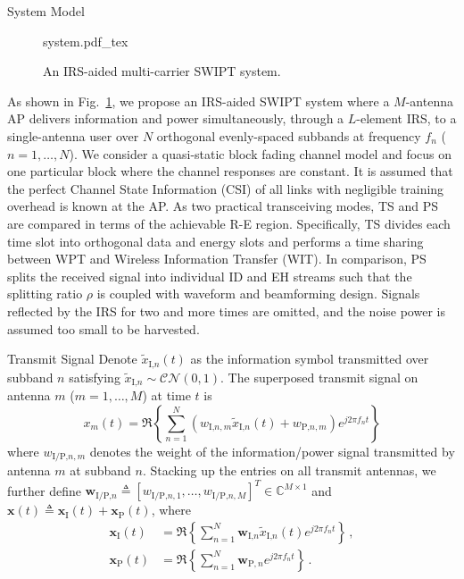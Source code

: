 \documentclass[journal]{IEEEtran}
\begin{document}
	\begin{section}{System Model}\label{se:system_model}
		\begin{figure}[!t]
			\centering
			\def\svgwidth{\columnwidth}
			{system.pdf_tex}
			\caption{An IRS-aided multi-carrier SWIPT system.}
			\label{fi:system}
		\end{figure}

		As shown in Fig.~\ref{fi:system}, we propose an IRS-aided SWIPT system where a $M$-antenna AP delivers information and power simultaneously, through a $L$-element IRS, to a single-antenna user over $N$ orthogonal evenly-spaced subbands at frequency $f_n$ ($n=1,\dots,N$). We consider a quasi-static block fading channel model and focus on one particular block where the channel responses are constant. It is assumed that the perfect Channel State Information (CSI) of all links with negligible training overhead is known at the AP. As two practical transceiving modes, TS and PS are compared in terms of the achievable R-E region. Specifically, TS divides each time slot into orthogonal data and energy slots and performs a time sharing between WPT and Wireless Information Transfer (WIT). In comparison, PS splits the received signal into individual ID and EH streams such that the splitting ratio $\rho$ is coupled with waveform and beamforming design. Signals reflected by the IRS for two and more times are omitted, and the noise power is assumed too small to be harvested.


		\begin{subsection}{Transmit Signal}
			Denote $\tilde{x}_{\text{I,}n}(t)$ as the information symbol transmitted over subband $n$ satisfying $\tilde{x}_{\text{I,}n}\sim\mathcal{CN}(0,1)$. The superposed transmit signal on antenna $m$ ($m=1,\dots,M$) at time $t$ is
			\begin{equation}\label{eq:x_m}
				x_m(t)=\Re\left\{\sum_{n=1}^N\left({w_{\text{I,}n,m}\tilde{x}_{\text{I,}n}(t)}+w_{\text{P,}n,m}\right){e^{j2{\pi}{f_n}{t}}}\right\}
			\end{equation}
			where $w_{\text{I/P,}n,m}$ denotes the weight of the information/power signal transmitted by antenna $m$ at subband $n$. Stacking up the entries on all transmit antennas, we further define $\boldsymbol{w}_{\text{I/P,}n} \triangleq [w_{\text{I/P,}n,1},\dots,w_{\text{I/P,}n,M}]^T \in \mathbb{C}^{M \times 1}$ and $\boldsymbol{x}(t) \triangleq \boldsymbol{x}_{\text{I}}(t)+\boldsymbol{x}_{\text{P}}(t)$, where
			\begin{align}
				\boldsymbol{x}_{\text{I}}(t) &= \Re{\left\{\sum_{n=1}^N\boldsymbol{w}_{\text{I,}n}\tilde{x}_{\text{I,}n}(t){e^{j2{\pi}{f_n}{t}}}\right\}}\,,\label{eq:x_I}\\
				\boldsymbol{x}_{\text{P}}(t) &= \Re{\left\{\sum_{n=1}^N\boldsymbol{w}_{\text{P},n}{e^{j2{\pi}{f_n}{t}}}\right\}}\,.\label{eq:x_P}
			\end{align}
		\end{subsection}



\end{section}
\end{document}
